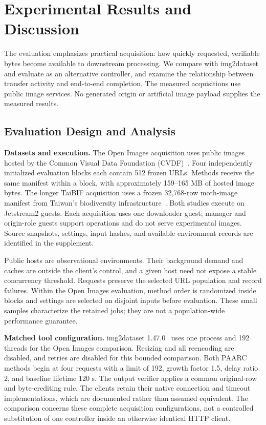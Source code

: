 \section{Experimental Results and Discussion}\label{sec:results}
The evaluation emphasizes practical acquisition: how quickly requested, verifiable bytes become available to downstream processing. We compare \paarc{} with img2dataset and evaluate \ratio{} as an alternative controller, and examine the relationship between transfer activity and end-to-end completion. The measured acquisitions use public image services. No generated origin or artificial image payload supplies the measured results.

\subsection{Evaluation Design and Analysis}
\textbf{Datasets and execution.} The Open Images acquisition uses public images hosted by the Common Visual Data Foundation (CVDF)~\cite{cvdf}. Four independently initialized evaluation blocks each contain 512 frozen URLs. Methods receive the same manifest within a block, with approximately 159--165 MB of hosted image bytes. The longer TaiBIF acquisition uses a frozen 32,768-row moth-image manifest from Taiwan's biodiversity infrastructure~\cite{taibif}. Both studies execute on Jetstream2 guests. Each acquisition uses one downloader guest; manager and origin-role guests support operations and do not serve experimental images. Source snapshots, settings, input hashes, and available environment records are identified in the supplement.

Public hosts are observational environments. Their background demand and caches are outside the client's control, and a given host need not expose a stable concurrency threshold. Requests preserve the selected URL population and record failures. Within the Open Images evaluation, method order is randomized inside blocks and settings are selected on disjoint inputs before evaluation. These small samples characterize the retained jobs; they are not a population-wide performance guarantee.

\textbf{Matched tool configuration.} img2dataset 1.47.0~\cite{img2dataset} uses one process and 192 threads for the Open Images comparison. Resizing and all reencoding are disabled, and retries are disabled for this bounded comparison. Both PAARC methods begin at four requests with a limit of 192, growth factor 1.5, delay ratio 2, and baseline lifetime 120 s. The output verifier applies a common original-row and byte-crediting rule. The clients retain their native connection and timeout implementations, which are documented rather than assumed equivalent. The comparison concerns these complete acquisition configurations, not a controlled substitution of one controller inside an otherwise identical HTTP client.


